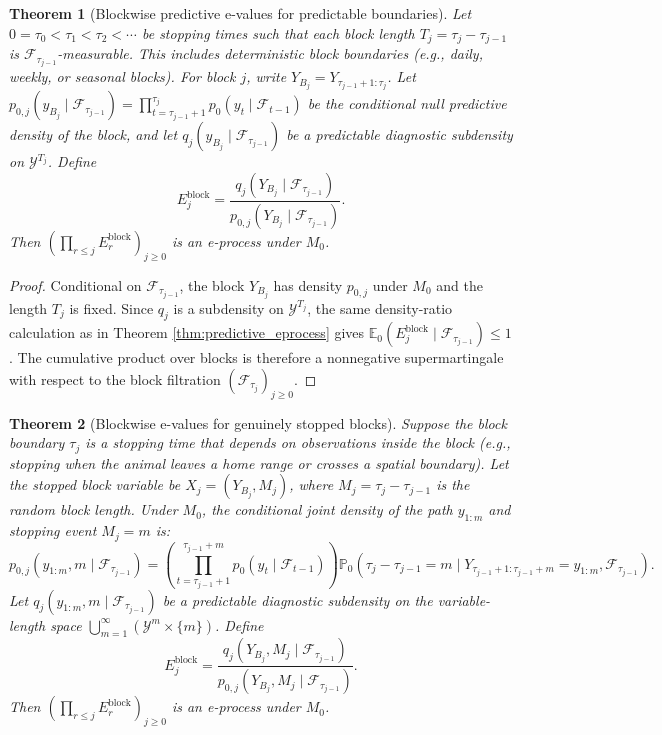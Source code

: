\documentclass[pdflatex,sn-basic]{sn-jnl}
\theoremstyle{thmstyleone}
\newtheorem{theorem}{Theorem}
\theoremstyle{thmstyletwo}
\theoremstyle{thmstylethree}
\newcommand{\E}{\mathbb E}
\newcommand{\Pbb}{\mathbb P}
\newcommand{\1}{\mathbf 1}
\newcommand{\calF}{\mathcal F}
\newcommand{\calY}{\mathcal Y}
\begin{document}
\begin{theorem}[Blockwise predictive e-values for predictable boundaries]
\label{thm:block_predictable}
Let $0=\tau_0<\tau_1<\tau_2<\cdots$ be stopping times such that each block length $T_j = \tau_j - \tau_{j-1}$ is $\calF_{\tau_{j-1}}$-measurable. This includes deterministic block boundaries (e.g., daily, weekly, or seasonal blocks). For block $j$, write $Y_{B_j}=Y_{\tau_{j-1}+1:\tau_j}$. Let $p_{0,j}(y_{B_j}\mid\calF_{\tau_{j-1}}) = \prod_{t=\tau_{j-1}+1}^{\tau_j} p_0(y_t\mid\calF_{t-1})$ be the conditional null predictive density of the block, and let $q_j(y_{B_j}\mid\calF_{\tau_{j-1}})$ be a predictable diagnostic subdensity on $\calY^{T_j}$. Define
\begin{equation}
 E_j^{\mathrm{block}}=\frac{q_j(Y_{B_j}\mid\calF_{\tau_{j-1}})}{p_{0,j}(Y_{B_j}\mid\calF_{\tau_{j-1}})}.
\end{equation}
Then $(\prod_{r\leq j}E_r^{\mathrm{block}})_{j\geq0}$ is an e-process under $M_0$.
\end{theorem}

\begin{proof}
Conditional on $\calF_{\tau_{j-1}}$, the block $Y_{B_j}$ has density $p_{0,j}$ under $M_0$ and the length $T_j$ is fixed. Since $q_j$ is a subdensity on $\calY^{T_j}$, the same density-ratio calculation as in Theorem \ref{thm:predictive_eprocess} gives $\E_0(E_j^{\mathrm{block}}\mid\calF_{\tau_{j-1}})\leq1$. The cumulative product over blocks is therefore a nonnegative supermartingale with respect to the block filtration $(\calF_{\tau_j})_{j\geq 0}$.
\end{proof}

\begin{theorem}[Blockwise e-values for genuinely stopped blocks]
\label{thm:block_stopped}
Suppose the block boundary $\tau_j$ is a stopping time that depends on observations inside the block (e.g., stopping when the animal leaves a home range or crosses a spatial boundary). Let the stopped block variable be $X_j = (Y_{B_j}, M_j)$, where $M_j = \tau_j - \tau_{j-1}$ is the random block length. Under $M_0$, the conditional joint density of the path $y_{1:m}$ and stopping event $M_j = m$ is:
\begin{equation}
 p_{0,j}(y_{1:m}, m\mid\calF_{\tau_{j-1}}) = \left( \prod_{t=\tau_{j-1}+1}^{\tau_{j-1}+m} p_0(y_t\mid\calF_{t-1}) \right) \Pbb_0(\tau_j - \tau_{j-1} = m \mid Y_{\tau_{j-1}+1:\tau_{j-1}+m} = y_{1:m}, \calF_{\tau_{j-1}}).
\end{equation}
Let $q_j(y_{1:m}, m \mid \calF_{\tau_{j-1}})$ be a predictable diagnostic subdensity on the variable-length space $\bigcup_{m=1}^\infty (\calY^m \times \{m\})$. Define
\begin{equation}
 E_j^{\mathrm{block}}=\frac{q_j(Y_{B_j}, M_j\mid\calF_{\tau_{j-1}})}{p_{0,j}(Y_{B_j}, M_j\mid\calF_{\tau_{j-1}})}.
\end{equation}
Then $(\prod_{r\leq j}E_r^{\mathrm{block}})_{j\geq0}$ is an e-process under $M_0$.
\end{theorem}
\end{document}
